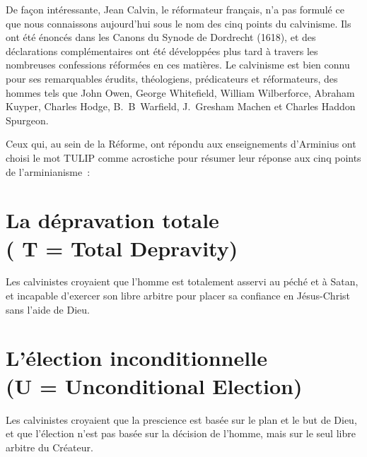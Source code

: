 
\digestpagebreak
\pocketpagebreak
\begin{digestpar}{}
\begin{pocketpar}{}
De façon intéressante, Jean Calvin, le réformateur français, n'a pas formulé
 ce que nous con\-naissons au\-jour\-d'hui sous le nom des cinq points du calvinisme.
 Ils ont été énoncés dans les Canons du Synode de Dordrecht (1618), et des déclarations
 complémentaires ont été développées plus tard à travers les nombreuses
 confessions réformées en ces matières. Le calvinisme est bien connu
 pour 
 ses remarquables érudits, théologiens, prédicateurs et réformateurs,
 des hommes tels que John Owen, George Whitefield,
 William Wilberforce, Abraham Kuyper, Charles Hodge,
 B.~B~Warfield, J.~Gresham Machen et
 Charles Haddon Spurgeon.
\end{pocketpar}
\end{digestpar}

Ceux qui, au sein de la Réforme, ont répondu aux enseignements d'Arminius
 ont choisi le mot \og \mbox{TULIP} \fg{} comme acrostiche pour résumer
 leur réponse aux cinq points de l'arminianisme~:

\nobreak

\newcommand*{\sectitle}[1]{%
   \normalsize(#1)}
\newcommand*{\secwithtitle}[2]{%
   \section*{#1\\\sectitle{#2}}}

\secwithtitle{La dépravation totale}{ T = Total Depravity}

Les calvinistes croyaient que l'hom\-me est totalement 
 asservi au péché  et à Satan,
 et incapable d'exercer son libre arbitre 
 pour placer sa confiance en Jésus-Christ sans l'aide de Dieu.

\secwithtitle{L'élection inconditionnelle}{U = Unconditional Election}

Les calvinistes croyaient que la prescience
 est basée sur le plan et le but de Dieu, et que l'élection
 n'est pas basée sur la décision de l'hom\-me, mais sur le seul \og libre arbitre \fg{}
 du Créateur.

